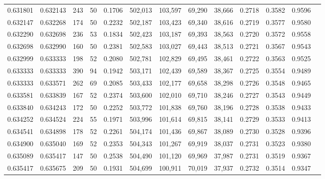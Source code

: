 \begin{tabular}{rrrrrrrrrrrrr}
0.631801 & 0.632143 &    243 &    50 &                                     0.1706 & 502,013 & 103,597 &  69,290 &  38,666 & 0.2718 & 0.3582 & 0.9596 \\
0.632147 & 0.632268 &    174 &    50 &                                     0.2232 & 502,187 & 103,423 &  69,340 &  38,616 & 0.2719 & 0.3577 & 0.9580 \\
0.632290 & 0.632698 &    236 &    53 &                                     0.1834 & 502,423 & 103,187 &  69,393 &  38,563 & 0.2720 & 0.3572 & 0.9558 \\
0.632698 & 0.632990 &    160 &    50 &                                     0.2381 & 502,583 & 103,027 &  69,443 &  38,513 & 0.2721 & 0.3567 & 0.9543 \\
0.632999 & 0.633333 &    198 &    52 &                                     0.2080 & 502,781 & 102,829 &  69,495 &  38,461 & 0.2722 & 0.3563 & 0.9525 \\
0.633333 & 0.633333 &    390 &    94 &                                     0.1942 & 503,171 & 102,439 &  69,589 &  38,367 & 0.2725 & 0.3554 & 0.9489 \\
0.633333 & 0.633571 &    262 &    69 &                                     0.2085 & 503,433 & 102,177 &  69,658 &  38,298 & 0.2726 & 0.3548 & 0.9465 \\
0.633581 & 0.633839 &    167 &    52 &                                     0.2374 & 503,600 & 102,010 &  69,710 &  38,246 & 0.2727 & 0.3543 & 0.9449 \\
0.633840 & 0.634243 &    172 &    50 &                                     0.2252 & 503,772 & 101,838 &  69,760 &  38,196 & 0.2728 & 0.3538 & 0.9433 \\
0.634252 & 0.634524 &    224 &    55 &                                     0.1971 & 503,996 & 101,614 &  69,815 &  38,141 & 0.2729 & 0.3533 & 0.9413 \\
0.634541 & 0.634898 &    178 &    52 &                                     0.2261 & 504,174 & 101,436 &  69,867 &  38,089 & 0.2730 & 0.3528 & 0.9396 \\
0.634900 & 0.635040 &    169 &    52 &                                     0.2353 & 504,343 & 101,267 &  69,919 &  38,037 & 0.2731 & 0.3523 & 0.9380 \\
0.635089 & 0.635417 &    147 &    50 &                                     0.2538 & 504,490 & 101,120 &  69,969 &  37,987 & 0.2731 & 0.3519 & 0.9367 \\
0.635417 & 0.635675 &    209 &    50 &                                     0.1931 & 504,699 & 100,911 &  70,019 &  37,937 & 0.2732 & 0.3514 & 0.9347 \\

\end{tabular}
